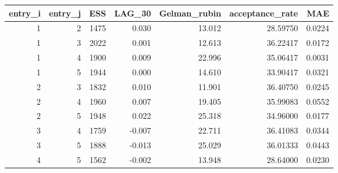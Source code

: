 \begin{longtable}{rrrrrrr}
\toprule
entry\_i & entry\_j & ESS & LAG\_30 & Gelman\_rubin & acceptance\_rate & MAE \\ 
\midrule
1 & 2 & 1475 & 0.030 & 13.012 & 28.59750 & 0.0224 \\ 
1 & 3 & 2022 & 0.001 & 12.613 & 36.22417 & 0.0172 \\ 
1 & 4 & 1900 & 0.009 & 22.996 & 35.06417 & 0.0031 \\ 
1 & 5 & 1944 & 0.000 & 14.610 & 33.90417 & 0.0321 \\ 
2 & 3 & 1832 & 0.010 & 11.901 & 36.40750 & 0.0245 \\ 
2 & 4 & 1960 & 0.007 & 19.405 & 35.99083 & 0.0552 \\ 
2 & 5 & 1948 & 0.022 & 25.318 & 34.96000 & 0.0177 \\ 
3 & 4 & 1759 & -0.007 & 22.711 & 36.41083 & 0.0344 \\ 
3 & 5 & 1888 & -0.013 & 25.029 & 36.01333 & 0.0443 \\ 
4 & 5 & 1562 & -0.002 & 13.948 & 28.64000 & 0.0230 \\ 
\bottomrule
\end{longtable}

